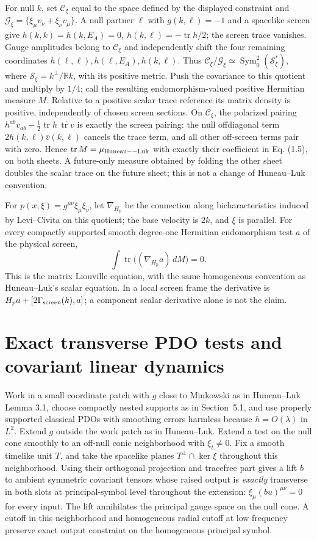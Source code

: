 \documentclass[11pt]{article}
\begin{document}
For null \(k\), set \(\mathcal C_\xi\) equal to the space defined by the displayed constraint and \(\mathcal G_\xi=\{\xi_\mu v_\nu+\xi_\nu v_\mu\}\). A null partner \(\ell\) with \(g(k,\ell)=-1\) and a spacelike screen give \(h(k,k)=h(k,E_A)=0,\ h(k,\ell)=-\operatorname{tr}h/2\); the screen trace vanishes. Gauge amplitudes belong to \(\mathcal C_\xi\) and independently shift the four remaining coordinates \(h(\ell,\ell),h(\ell,E_A),h(k,\ell)\). Thus \(\mathcal C_\xi/\mathcal G_\xi\simeq\operatorname{Sym}^2_0(\mathscr S_\xi^*)\), where \(\mathscr S_\xi=k^\perp/\mathbb R k\), with its positive metric. Push the covariance to this quotient and multiply by \(1/4\); call the resulting endomorphism-valued positive Hermitian measure \(M\). Relative to a positive scalar trace reference its matrix density is positive, independently of chosen screen sections. On \(\mathcal C_\xi\), the polarized pairing \(h^{ab}\bar v_{ab}-\tfrac12\operatorname{tr}h\,\overline{\operatorname{tr}v}\) is exactly the screen pairing: the null offdiagonal term \(2h(k,\ell)\bar v(k,\ell)\) cancels the trace term, and all other off-screen terms pair with zero. Hence \(\operatorname{tr}M=\mu_{\rm Huneau--Luk}\) with exactly their coefficient in Eq. (1.5), on both sheets. A future-only measure obtained by folding the other sheet doubles the scalar trace on the future sheet; this is not a change of Huneau--Luk convention.

For \(p(x,\xi)=g^{\mu\nu}\xi_\mu\xi_\nu\), let \(\nabla_{H_p}\) be the connection along bicharacteristics induced by Levi--Civita on this quotient; the base velocity is \(2k\), and \(\xi\) is parallel. For every compactly supported smooth degree-one Hermitian endomorphism test \(a\) of the physical screen,
\[
       \int \operatorname{tr}\bigl((\nabla_{H_p} a)\,dM\bigr)=0 .
\]
This is the matrix Liouville equation, with the same homogeneous convention as Huneau--Luk's scalar equation. In a local screen frame the derivative is \(H_p a+[2\Gamma_{\rm screen}(k),a]\); a component scalar derivative alone is not the claim.

\section{Exact transverse PDO tests and covariant linear dynamics}
Work in a small coordinate patch with \(g\) close to Minkowski as in Huneau--Luk Lemma 3.1, choose compactly nested supports as in Section~5.1, and use properly supported classical PDOs with smoothing errors harmless because \(h=O(\lambda)\) in \(L^2\). Extend \(g\) outside the work patch as in Huneau--Luk. Extend a test on the null cone smoothly to an off-null conic neighborhood with \(\xi_t\ne0\). Fix a smooth timelike unit \(T\), and take the spacelike planes \(T^\perp\cap\ker\xi\) throughout this neighborhood. Using their orthogonal projection and tracefree part gives a lift \(b\) to ambient symmetric covariant tensors whose raised output is \emph{exactly} transverse in both slots at principal-symbol level throughout the extension: \(\xi_\mu(bu)^{\mu\nu}=0\) for every input. The lift annihilates the principal gauge space on the null cone. A cutoff in this neighborhood and homogeneous radial cutoff at low frequency preserve exact output constraint on the homogeneous principal symbol.
\end{document}
